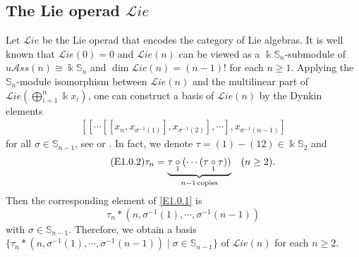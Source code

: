 \documentclass{amsart}
\newtheorem{thm}{Theorem}[section]
\theoremstyle{definition}
\theoremstyle{remark}
\numberwithin{equation}{section}
\def\S{\mathbb{S}}
\newcommand{\ucr}[1]{\underset{#1}{\circ}}
\def\la{\lambda}
\def \uas{u\mathcal{A}ss}
\def \Lie{\mathcal{L}ie}
\def \dim{\operatorname{dim}}
\def \S{\mathbb{S}}
\begin{document}
\subsection{The Lie operad $\Lie$}
\label{yysec1.2}
Let $\Lie$ be the Lie operad that encodes the category 
of Lie algebras. It is well known that $\Lie(0)=0$ and 
$\Lie(n)$ can be viewed as a $\Bbbk\S_n$-submodule of 
$\uas(n)\cong\Bbbk\S_n$ and $\dim\Lie(n)=(n-1)!$ for each 
$n\ge 1$. Applying the $\S_n$-module isomorphism between 
$\Lie(n)$ and the multilinear part of 
$\Lie(\bigoplus_{i=1}^n\Bbbk x_i)$, one can construct a 
basis of $\Lie(n)$ by the Dynkin elements
\begin{align}
\label{E1.0.1}\tag{E1.0.1}
[[\cdots[[x_n, x_{\sigma^{-1}(1)}], x_{\sigma^{-1}(2)}], 
\cdots], x_{\sigma^{-1}(n-1)}]
\end{align}
for all $\sigma\in \S_{n-1}$, see \cite[Lemma 5.1.1 and 
Section 13.2.4]{LV} or \cite{Reu}. In fact, we denote 
$\tau=(1)-(12)\in \Bbbk\S_2$ and 
\begin{align}\label{E1.0.2}\tag{E1.0.2}
\tau_n=\underbrace{\tau\ucr{1}
(\cdots (\tau\ucr{1}\tau))}_{n-1\, 
{\footnotesize \rm copies}}\quad (n\ge 2).
\end{align}
Then the corresponding element of \eqref{E1.0.1} is 
\[\tau_n\ast (n, \sigma^{-1}(1), \cdots, \sigma^{-1}(n-1))\]
with $\sigma\in \S_{n-1}$. Therefore, we obtain a basis 
$\{\tau_n\ast (n, \sigma^{-1}(1), \cdots, \sigma^{-1}(n-1))
\mid \sigma\in \S_{n-1}\}$ of $\Lie(n)$ for each $n\ge 2$.


%
%
\end{document}
